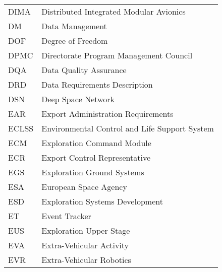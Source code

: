 \begin{longtable}{ll}
  DIMA &            Distributed Integrated Modular Avionics \\  
 
    DM &                                    Data Management \\  
 
   DOF &                                  Degree of Freedom \\  
 
  DPMC &             Directorate Program Management Council \\  
 
   DQA &                             Data Quality Assurance \\  
 
   DRD &                      Data Requirements Description \\  
 
   DSN &                                 Deep Space Network \\  
 
   EAR &                 Export Administration Requirements \\  
 
 ECLSS &      Environmental Control and Life Support System \\  
 
   ECM &                         Exploration Command Module \\  
 
   ECR &                      Export Control Representative \\  
 
   EGS &                         Exploration Ground Systems \\  
 
   ESA &                              European Space Agency \\  
 
   ESD &                    Exploration Systems Development \\  
 
    ET &                                      Event Tracker \\  
 
   EUS &                            Exploration Upper Stage \\  
 
   EVA &                           Extra-Vehicular Activity \\  
 
   EVR &                           Extra-Vehicular Robotics \\  
 

\end{longtable}
